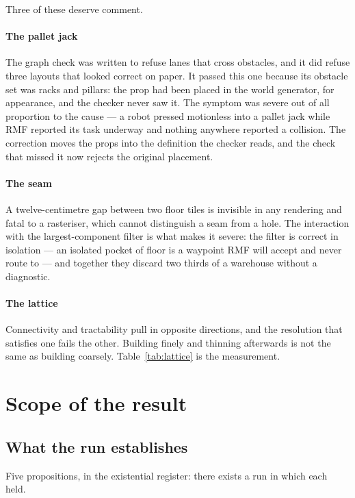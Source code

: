 \documentclass[11pt,a4paper]{article}
\theoremstyle{definition}
\begin{document}
Three of these deserve comment.

\paragraph{The pallet jack} The graph check was written to refuse lanes that
cross obstacles, and it did refuse three layouts that looked correct on paper.
It passed this one because its obstacle set was racks and pillars: the prop had
been placed in the world generator, for appearance, and the checker never saw
it. The symptom was severe out of all proportion to the cause --- a robot
pressed motionless into a pallet jack while RMF reported its task underway and
nothing anywhere reported a collision. The correction moves the props into the definition the checker reads, and the check that missed it now rejects the
original placement.

\paragraph{The seam} A twelve-centimetre gap between two floor tiles is
invisible in any rendering and fatal to a rasteriser, which cannot distinguish
a seam from a hole. The interaction with the largest-component filter is what makes it severe: the filter is correct in isolation --- an isolated
pocket of floor is a waypoint RMF will accept and never route to --- and
together they discard two thirds of a warehouse without a diagnostic.

\paragraph{The lattice} Connectivity and tractability pull in opposite
directions, and the resolution that satisfies one fails the other. Building finely and thinning afterwards is not the same as building coarsely. Table~\ref{tab:lattice} is the measurement.

\section{Scope of the result}
\label{sec:notestablished}

\subsection{What the run establishes}

Five propositions, in the existential register: there exists a run in which each
held.
\end{document}
